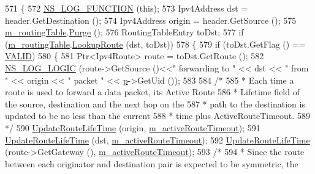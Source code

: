 \begin{DoxyCode}
571 \{
572   \hyperlink{log-macros-disabled_8h_a90b90d5bad1f39cb1b64923ea94c0761}{NS\_LOG\_FUNCTION} (\textcolor{keyword}{this});
573   Ipv4Address dst = header.GetDestination ();
574   Ipv4Address origin = header.GetSource ();
575   \hyperlink{classns3_1_1aodv_1_1RoutingProtocol_a4e1003a34c8adc96db71096d88c98ae0}{m\_routingTable}.\hyperlink{classns3_1_1aodv_1_1RoutingTable_a2d0250f231e06733c06a43f5ec6a310b}{Purge} ();
576   RoutingTableEntry toDst;
577   \textcolor{keywordflow}{if} (\hyperlink{classns3_1_1aodv_1_1RoutingProtocol_a4e1003a34c8adc96db71096d88c98ae0}{m\_routingTable}.\hyperlink{classns3_1_1aodv_1_1RoutingTable_a90cbc8a2c65cd68ccdaf768fcbb5d723}{LookupRoute} (dst, toDst))
578     \{
579       \textcolor{keywordflow}{if} (toDst.GetFlag () == \hyperlink{group__aodv_gga44216921a9c725a5ab8bc19059052a26af5fecee96bb2650aa417994840b43c99}{VALID})
580         \{
581           Ptr<Ipv4Route> route = toDst.GetRoute ();
582           \hyperlink{group__logging_ga88acd260151caf2db9c0fc84997f45ce}{NS\_LOG\_LOGIC} (route->GetSource ()<<\textcolor{stringliteral}{" forwarding to "} << dst << \textcolor{stringliteral}{" from "} << origin << \textcolor{stringliteral}{
      " packet "} << \hyperlink{lte__link__budget_8m_ac9de518908a968428863f829398a4e62}{p}->GetUid ());
583 
584           \textcolor{comment}{/*}
585 \textcolor{comment}{           *  Each time a route is used to forward a data packet, its Active Route}
586 \textcolor{comment}{           *  Lifetime field of the source, destination and the next hop on the}
587 \textcolor{comment}{           *  path to the destination is updated to be no less than the current}
588 \textcolor{comment}{           *  time plus ActiveRouteTimeout.}
589 \textcolor{comment}{           */}
590           \hyperlink{classns3_1_1aodv_1_1RoutingProtocol_a204c68e4ce5aa8dc799f9fd039f8cbc7}{UpdateRouteLifeTime} (origin, \hyperlink{classns3_1_1aodv_1_1RoutingProtocol_a37ec921ef1c48e4d8e7072fe989613d2}{m\_activeRouteTimeout});
591           \hyperlink{classns3_1_1aodv_1_1RoutingProtocol_a204c68e4ce5aa8dc799f9fd039f8cbc7}{UpdateRouteLifeTime} (dst, \hyperlink{classns3_1_1aodv_1_1RoutingProtocol_a37ec921ef1c48e4d8e7072fe989613d2}{m\_activeRouteTimeout});
592           \hyperlink{classns3_1_1aodv_1_1RoutingProtocol_a204c68e4ce5aa8dc799f9fd039f8cbc7}{UpdateRouteLifeTime} (route->GetGateway (), 
      \hyperlink{classns3_1_1aodv_1_1RoutingProtocol_a37ec921ef1c48e4d8e7072fe989613d2}{m\_activeRouteTimeout});
593           \textcolor{comment}{/*}
594 \textcolor{comment}{           *  Since the route between each originator and destination pair is expected to be symmetric, the}

\end{DoxyCode}
